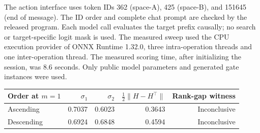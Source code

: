 The action interface uses token IDs 362 (space-A), 425 (space-B), and 151645 (end of message). The ID order and complete chat prompt are checked by the released program. Each model call evaluates the target prefix causally; no search or target-specific logit mask is used. The measured sweep used the CPU execution provider of ONNX Runtime 1.32.0, three intra-operation threads and one inter-operation thread. The measured scoring time, after initializing the session, was 8.6 seconds. Only public model parameters and generated gate instances were used.
\begin{center}
\begin{tabular}{lrrrr}\toprule
Order at $m=1$ & $\sigma_1$ & $\sigma_2$ & $\frac12\|H-H^\top\|$ & Rank-gap witness\\\midrule
Ascending & 0.7037 & 0.6023 & 0.3643 & Inconclusive \\
Descending & 0.6924 & 0.6848 & 0.4594 & Inconclusive \\
\bottomrule\end{tabular}\end{center}
